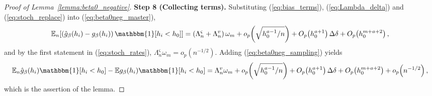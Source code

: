 \documentclass{article}
\newcommand{\normm}[1]{\lVert#1\rVert}
\newcommand{\E}{\mathbb{E}}
\newcommand{\I}{\mathbbm{1}}
\begin{document}
\begin{appendices}
\begin{proof}[Proof of Lemma~\ref{lemma:beta0_negative}]
\textbf{Step 8 (Collecting terms).}
Substituting (\ref{eq:bias_terms}), (\ref{eq:Lambda_delta}) and
(\ref{eq:stoch_replace}) into (\ref{eq:beta0neg_master}),
\begin{align*}
    \E_n\!\left[\left(\hat{g}_\beta(h_i)-g_\beta(h_i)\right)\I[h_i<h_0]\right]
    = \left(\Lambda_n^{\varsigma}+\Lambda_n^{v}\right)\omega_m
      + o_p\!\left(\sqrt{h_0^{a-1}/n}\right)
      + O_p\!\left(h_0^{a+1}\right)\Delta\delta
      + O_p\!\left(h_0^{m+a+2}\right),
\end{align*}
and by the first statement in (\ref{eq:stoch_rates}),
$\Lambda_n^{\varsigma}\omega_m=o_p(n^{-1/2})$. Adding
(\ref{eq:beta0neg_sampling}) yields
\begin{align*}
    \E_n \hat{g}_\beta(h_i)\I[h_i<h_0] - \E g_\beta(h_i)\I[h_i<h_0]
    = \Lambda_n^{v}\omega_m
      + o_p\!\left(\sqrt{h_0^{a-1}/n}\right)
      + O_p\!\left(h_0^{a+1}\right)\Delta\delta
      + O_p\!\left(h_0^{m+a+2}\right)
      + o_p\!\left(n^{-1/2}\right),
\end{align*}
which is the assertion of the lemma.

\end{proof}

    

\end{appendices}
\end{document}
